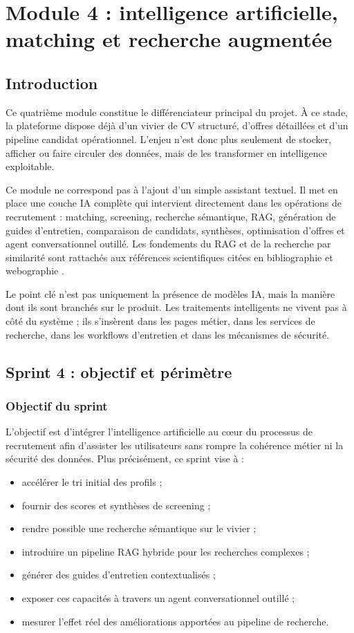 \chapter{Module 4 : intelligence artificielle, matching et recherche augmentée}

\section*{Introduction}
Ce quatrième module constitue le différenciateur principal du projet. À ce stade, la plateforme dispose déjà d'un vivier de CV structuré, d'offres détaillées et d'un pipeline candidat opérationnel. L'enjeu n'est donc plus seulement de stocker, afficher ou faire circuler des données, mais de les transformer en intelligence exploitable.

Ce module ne correspond pas à l'ajout d'un simple assistant textuel. Il met en place une couche IA complète qui intervient directement dans les opérations de recrutement : matching, screening, recherche sémantique, RAG, génération de guides d'entretien, comparaison de candidats, synthèses, optimisation d'offres et agent conversationnel outillé. Les fondements du RAG et de la recherche par similarité sont rattachés aux références scientifiques citées en bibliographie et webographie .

Le point clé n'est pas uniquement la présence de modèles IA, mais la manière dont ils sont branchés sur le produit. Les traitements intelligents ne vivent pas à côté du système ; ils s'insèrent dans les pages métier, dans les services de recherche, dans les workflows d'entretien et dans les mécanismes de sécurité.

\section{Sprint 4 : objectif et périmètre}

\subsection{Objectif du sprint}
L'objectif est d'intégrer l'intelligence artificielle au cœur du processus de recrutement afin d'assister les utilisateurs sans rompre la cohérence métier ni la sécurité des données. Plus précisément, ce sprint vise à :
\begin{itemize}
  \item accélérer le tri initial des profils ;
  \item fournir des scores et synthèses de screening ;
  \item rendre possible une recherche sémantique sur le vivier ;
  \item introduire un pipeline RAG hybride pour les recherches complexes ;
  \item générer des guides d'entretien contextualisés ;
  \item exposer ces capacités à travers un agent conversationnel outillé ;
  \item mesurer l'effet réel des améliorations apportées au pipeline de recherche.
\end{itemize}

